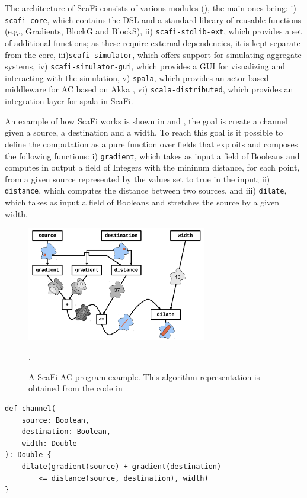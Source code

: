 \documentclass[12pt,a4paper,openright,twoside]{book}
\begin{document}
The architecture of ScaFi consists of various modules (), the main ones being:
    i) \texttt{scafi-core}, which contains the DSL and a standard library of reusable functions 
        (e.g., Gradients, BlockG and BlockS),
    ii) \texttt{scafi-stdlib-ext}, which provides a set of additional functions; as these require external dependencies, 
        it is kept separate from the core,
    iii)\texttt{scafi-simulator}, which offers support for simulating aggregate systems,
    iv) \texttt{scafi-simulator-gui}, which provides a GUI for visualizing and interacting with the simulation,
    v) \texttt{spala}, which provides an actor-based middleware for AC based on Akka \cite{hunt2014introduction},
    vi) \texttt{scala-distributed}, which provides an integration layer for spala in ScaFi.

An example of how ScaFi works is shown in  and , the goal is create a channel given 
    a source, a destination and a width. To reach this goal is it possible to define the computation as a pure function 
    over fields that exploits and composes the following functions:
    i) \texttt{gradient}, which takes as input a field of Booleans and computes in output a field of Integers with the 
        mininum distance, for each point, from a given source represented by the values set to true in the input;
    ii) \texttt{distance}, which computes the distance between two sources, and
    iii) \texttt{dilate}, which takes as input a field of Booleans and stretches the source by a given width.

\begin{figure}[h!]
    \centering
    \includegraphics[width=0.7\textwidth]{figures/channel.png}
    \caption{A ScaFi AC program example. This algorithm representation is obtained from the code in }.
    \label{fig:channel}
\end{figure}

\begin{lstlisting}[caption={A ScaFi AC program example. The algorithm implements a channel between a source and a destination.}, label={lst:channel}]
def channel(
    source: Boolean, 
    destination: Boolean, 
    width: Double
): Double {
    dilate(gradient(source) + gradient(destination) 
        <= distance(source, destination), width)
}
\end{lstlisting}
\end{document}
